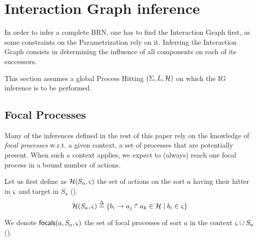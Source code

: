 \section{Interaction Graph inference}

In order to infer a complete BRN, one has to find the Interaction Graph first, as some constraints on the Parametrization rely on it. Inferring the Interaction Graph consists in determining the influence of all components on each of its successors.



This section assumes a global Process Hitting $(\Sigma,L,\mathcal{H})$ on which the IG inference is to be
performed.

\subsection{Focal Processes}

Many of the inferences defined in the rest of this paper rely on the knowledge of \emph{focal
processes} w.r.t. a given context, \ie{} a set of processes that are potentially present.
When such a context applies, we expect to (always) reach one focal process in a bound number of
actions.

Let us first define as $\mathcal{H}(S_a,\varsigma)$ the set of actions on the sort $a$ having their hitter in
$\varsigma$ and target in $S_a$ ().
\begin{equation}
\mathcal{H}(S_a,\varsigma) \stackrel{\Delta}= \{ b_i\rightarrow a_j\Rsh a_k\in\mathcal{H} \mid b_i\in\varsigma \}
\label{eq:PHa-ctx}
\end{equation}

We denote $\mathsf{focals}(a,S_a,\varsigma)$ the set of focal processes of sort $a$ in the context
$\varsigma\cup S_a$
().


